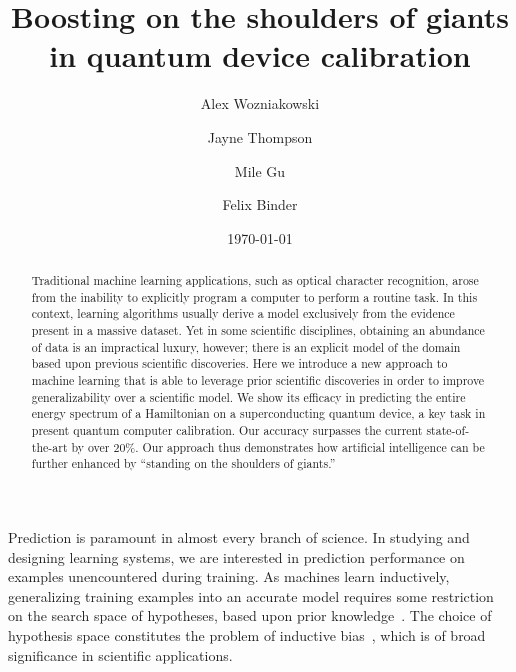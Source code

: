\documentclass[aps,twocolumn,superscriptaddress,floatfix,preprintnumbers,showkeys]{revtex4}
\begin{document}
\title{Boosting on the shoulders of giants in quantum device calibration}

\author{Alex Wozniakowski}
\author{Jayne Thompson}
\author{Mile Gu}
\author{Felix Binder}


\date{\today}

\begin{abstract}
Traditional machine learning applications, such as optical character recognition, arose from the inability to explicitly program a computer to perform a routine task. In this context, learning algorithms usually derive a model exclusively from the evidence present in a massive dataset. Yet in some scientific disciplines, obtaining an abundance of data is an impractical luxury, however; there is an explicit model of the domain based upon previous scientific discoveries. Here we introduce a new approach to machine learning that is able to leverage prior scientific discoveries in order to improve generalizability over a scientific model. We show its efficacy in predicting the entire energy spectrum of a Hamiltonian on a superconducting quantum device, a key task in present quantum computer calibration. Our accuracy surpasses the current state-of-the-art by over $20\%.$ Our approach thus demonstrates how artificial intelligence can be further enhanced by ``standing on the shoulders of giants.''
\end{abstract}

\maketitle

Prediction is paramount in almost every branch of science. In studying and designing learning systems, we are interested in prediction performance on examples unencountered during training. As machines learn inductively, generalizing training examples into an accurate model requires some restriction on the search space of hypotheses, based upon prior knowledge~\cite{Hume_1739,Haussler_1988, Mitchell_1991, Wolpert_1997}. The choice of hypothesis space constitutes the problem of inductive bias~\cite{Haussler_1988, Mitchell_1991, Caruana_1997, Wolpert_1997, Baxter_2000}, which is of broad significance in scientific applications.
\end{document}

